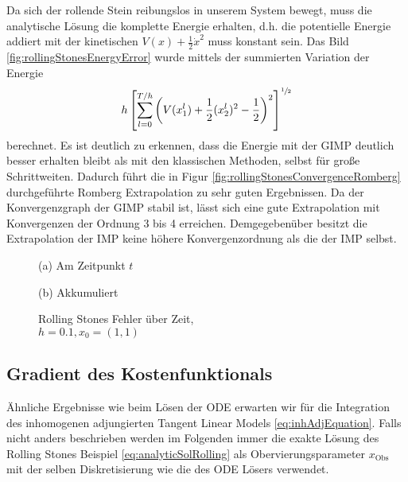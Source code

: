 Da sich der rollende Stein reibungslos in unserem System bewegt, muss die analytische Lösung die komplette Energie erhalten, d.h. die potentielle Energie addiert mit der kinetischen $V(x) + \frac{1}{2}\dot x^2$ muss konstant sein. Das Bild \ref{fig:rollingStonesEnergyError} wurde mittels der summierten Variation der Energie 
\[
 h \left[\sum_{l=0}^{T/h} \left( V(x_1^l) + \frac{1}{2} (x_2^l)^2 -\frac{1}{2}\right)^2\right]^{\sfrac{1}{2}}
\]
berechnet. Es ist deutlich zu erkennen, dass die Energie mit der GIMP deutlich besser erhalten bleibt als mit den klassischen Methoden, selbst für große Schrittweiten.
Dadurch führt die in Figur \ref{fig:rollingStonesConvergenceRomberg} durchgeführte Romberg Extrapolation zu sehr guten Ergebnissen. Da der Konvergenzgraph der GIMP stabil ist, lässt sich eine gute Extrapolation mit Konvergenzen der Ordnung 3 bis 4 erreichen. Demgegebenüber besitzt die Extrapolation der IMP keine höhere Konvergenzordnung als die der IMP selbst.
\begin{figure}[H]
\footnotesize 
\centering
\begin{minipage}[b]{0.49\linewidth}

\caption*{(a) Am Zeitpunkt $t$}\end{minipage}
\begin{minipage}[b]{0.49\linewidth}

\caption*{(b) Akkumuliert}
\end{minipage}
\caption{Rolling Stones Fehler über Zeit, \\$h=0.1,x_0=(1,1)$}
\label{fig:rollingStonesEOT}

\end{figure}

\subsection{Gradient des Kostenfunktionals}
Ähnliche Ergebnisse wie beim Lösen der ODE erwarten wir für die Integration des inhomogenen adjungierten Tangent Linear Models \eqref{eq:inhAdjEquation}. Falls nicht anders beschrieben werden im Folgenden immer die exakte Lösung des Rolling Stones Beispiel \eqref{eq:analyticSolRolling} als Obervierungsparameter $x_{\text{Obs}}$ mit der selben Diskretisierung wie die des ODE Lösers verwendet.

